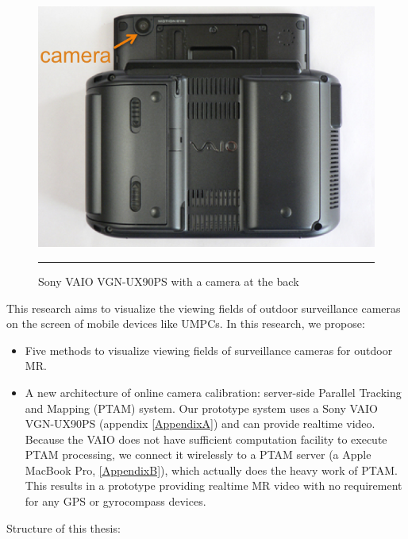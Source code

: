\begin{figure}[htbp]
	\centering
	\includegraphics{./Primitives/vaio_back.png}
	\rule{35em}{0.5pt}
	\caption[Sony VAIO VGN-UX90PS with a camera at the back]{Sony VAIO VGN-UX90PS with a camera at the back}
	\label{fig:VAIOBack}
\end{figure}

This research aims to visualize the viewing fields of outdoor surveillance cameras on the screen of mobile devices like UMPCs. In this research, we propose:

\begin{itemize}
	\item Five methods to visualize viewing fields of surveillance cameras for outdoor MR.
	\item A new architecture of online camera calibration: server-side Parallel Tracking and Mapping (PTAM) \cite{Reference12} system. Our prototype system uses a Sony VAIO VGN-UX90PS (appendix \ref{AppendixA}) and can provide realtime video. Because the VAIO does not have sufficient computation facility to execute PTAM processing, we connect it wirelessly to a PTAM server (a Apple MacBook Pro, \ref{AppendixB}), which actually does the heavy work of PTAM. This results in a prototype providing realtime MR video with no requirement for any GPS or gyrocompass devices.
\end{itemize}

Structure of this thesis:


